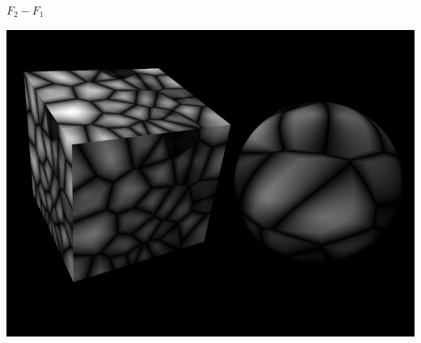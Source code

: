 \documentclass[utf8,stillsansserifmath,fleqn,t]{beamer}
\begin{document}
\begin{frame}[label=noise-5]
\begin{minipage}{.49\textwidth}
\centerline{$F_2 - F_1$}
\centerline{\includegraphics[width=.7\textwidth]{./fig/noise-example-worley-d2d1.png}}
\end{minipage}
\end{frame}
\end{document}
